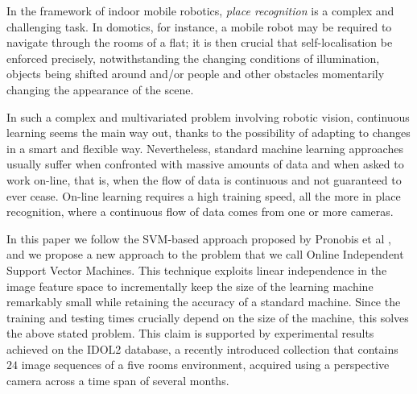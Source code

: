 In the framework of indoor mobile robotics, \emph{place recognition}
is a complex and challenging task. In domotics, for instance, a mobile
robot may be required to navigate through the rooms of a flat; it is
then crucial that self-localisation be enforced precisely,
notwithstanding the changing conditions of illumination, objects being
shifted around and/or people and other obstacles momentarily changing
the appearance of the scene.

In such a complex and multivariated problem involving robotic vision,
continuous learning seems the main way out, thanks to the possibility of
adapting to changes in a smart and flexible way. Nevertheless,
standard machine learning approaches usually suffer when confronted
with massive amounts of data and when asked to work on-line, that is,
when the flow of data is continuous and not guaranteed to ever
cease. On-line learning requires a high training speed, all the more
in place recognition, where a continuous flow of data comes from one
or more cameras.

In this paper we 
follow the SVM-based approach proposed by Pronobis et al \cite{pronobis:iros06},
and we
propose a new approach to the problem that we call
Online Independent Support Vector Machines. This technique exploits
linear independence in the image feature space to incrementally keep
the size of the learning machine remarkably small while retaining the
accuracy of a standard machine. Since the training and testing times
crucially depend on the size of the machine, this solves the above
stated problem. This claim is supported by  experimental results
achieved on the IDOL2 database, 
a recently introduced collection that
contains $24$ image sequences 
of a five rooms environment, acquired using a perspective camera across a time span of several months.
